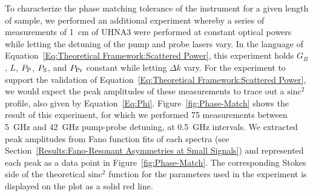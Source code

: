 To characterize the phase matching tolerance of the instrument for a given length of sample, we performed an additional experiment whereby a series of measurements of \SI{1}{\centi\meter} of UHNA3 were performed at constant optical powers while letting the detuning of the pump and probe lasers vary. In the language of Equation~\ref{Eq:Theoretical Framework:Scattered Power}, this experiment holds \(G_B\), \(L\), \(P_{\rm P}\), \(P_{\rm S}\), and \(P_{\rm Pr}\) constant while letting \(\Delta k\) vary. For the experiment to support the validation of Equation~\ref{Eq:Theoretical Framework:Scattered Power}, we would expect the peak amplitudes of these measurements to trace out a \(\mathrm{sinc^2}\) profile, also given by Equation~\ref{Eq:Phi}. Figure~\ref{fig:Phase-Match} shows the result of this experiment, for which we performed 75 measurements between \SI{5}{\giga\hertz} and \SI{42}{\giga\hertz} pump-probe detuning, at \SI{0.5}{\giga\hertz} intervals. We extracted peak amplitudes from Fano function fits of each spectra (see Section~\ref{Results:Fano-Resonant Asymmetries at Small Signals}) and represented each peak as a data point in Figure~\ref{fig:Phase-Match}. The corresponding Stokes side of the theoretical \(\mathrm{sinc^2}\) function for the parameters used in the experiment is displayed on the plot as a solid red line.

